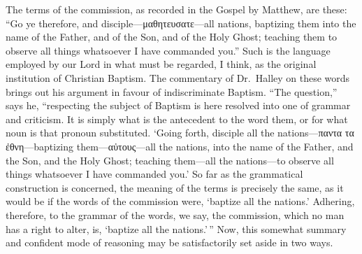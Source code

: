 \documentclass[]{book}
\begin{document}
The terms of the commission, as recorded in the Gospel by Matthew, are these: ``Go ye therefore, and disciple---μαθητευσατε---all nations, baptizing them into the name of the Father, and of the Son, and of the Holy Ghost; teaching them to observe all things whatsoever I have commanded you.'' Such is the language employed by our Lord in what must be regarded, I think, as the original institution of Christian Baptism. The commentary of Dr.~Halley on these words brings out his argument in favour of indiscriminate Baptism. ``The question,'' says he, ``respecting the subject of Baptism is here resolved into one of grammar and criticism. It is simply what is the antecedent to the word them, or for what noun is that pronoun substituted. `Going forth, disciple all the nations---παντα τα ἐθνη---baptizing them---αὐτους---all the nations, into the name of the Father, and the Son, and the Holy Ghost; teaching them---all the nations---to observe all things whatsoever I have commanded you.' So far as the grammatical construction is concerned, the meaning of the terms is precisely the same, as it would be if the words of the commission were, `baptize all the nations.' Adhering, therefore, to the grammar of the words, we say, the commission, which no man has a right to alter, is, `baptize all the nations.'\,'' Now, this somewhat summary and confident mode of reasoning may be satisfactorily set aside in two ways.
\end{document}
